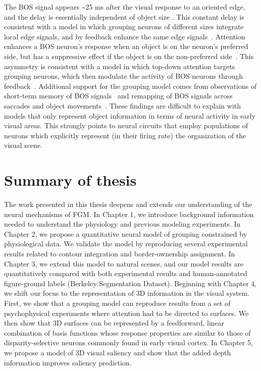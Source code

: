 The BOS signal appears \textasciitilde 25 ms after the visual response to an oriented edge, and the delay is essentially independent of object size \citep{Zhou_etal00}. This constant delay is consistent with a model in which grouping neurons of different sizes integrate local edge signals, and by feedback enhance the same edge  signals~\citep{Craft_etal07}. Attention enhances a BOS neuron's response when an object is on the neuron's preferred side, but has a suppressive effect if the object is on the non-preferred side~\citep{Qiu_etal07}. This asymmetry is consistent with a model in which top-down attention targets grouping neurons, which then modulate the activity of BOS neurons through feedback~\citep{Mihalas_etal11b}. Additional support for the grouping model comes from observations of short-term memory of BOS signals~\citep{OHerron_vonderHeydt09} and remapping of BOS signals across saccades and object movements~\citep{OHerron_vonderHeydt13}. These findings are difficult to explain with models that only represent object information in terms of neural activity in early visual areas. This strongly points to neural circuits that employ populations of neurons which explicitly represent (\ie in their firing rate) the organization of the visual scene.

\section{Summary of thesis} %

The work presented in this thesis deepens and extends our understanding of the neural mechanisms of FGM. In Chapter 1, we introduce background information needed to understand the physiology and previous modeling experiments. In Chapter 2, we propose a quantitative neural model of grouping constrained by physiological data. We validate the model by reproducing several experimental results related to contour integration and border-ownership assignment. In Chapter 3, we extend this model to natural scenes, and our model results are quantitatively compared with both experimental results and human-annotated figure-ground labels (Berkeley Segmentation Dataset). Beginning with Chapter 4, we shift our focus to the representation of 3D information in the visual system. First, we show that a grouping model can reproduce results from a set of psychophysical experiments where attention had to be directed to surfaces. We then show that 3D surfaces can be represented by a feedforward, linear combination of basis functions whose response properties are similar to those of disparity-selective neurons commonly found in early visual cortex. In Chapter 5, we propose a model of 3D visual saliency and show that the added depth information improves saliency prediction.

